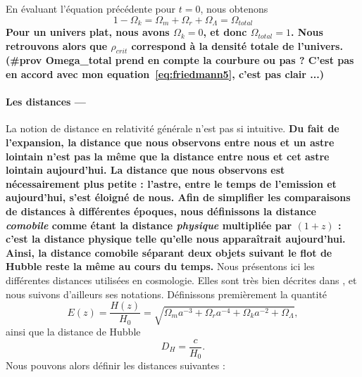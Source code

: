 \documentclass[11pt, twoside, a4paper, openright]{report}
\begin{document}
En évaluant l'équation précédente pour $t=0$, nous obtenons
\begin{equation}
  \label{eq:sum_omega}
 1 - \Omega_k  =  \Omega_m + \Omega_r + \Omega_{\Lambda} = \Omega_{total}
\end{equation}
\textbf{Pour un univers plat, nous avons $\Omega_k = 0$, et donc $\Omega_{total} = 1$. Nous retrouvons alors que $\rho_{crit}$ correspond à la densité totale de l'univers. (\#prov Omega\_total prend en compte la courbure ou pas ? C'est pas en accord avec mon equation~\ref{eq:friedmann5}, c'est pas clair ...)}


\paragraph{Les distances —}
La notion de distance en relativité générale n'est pas si intuitive.
\textbf{Du fait de l'expansion, la distance que nous observons entre nous et un astre lointain n'est pas la même que la distance entre nous et cet astre lointain aujourd'hui. La distance que nous observons est nécessairement plus petite : l'astre, entre le temps de l'emission et aujourd'hui, s'est éloigné de nous. Afin de simplifier les comparaisons de distances à différentes époques, nous définissons la distance \emph{comobile} comme étant la distance \emph{physique} multipliée par $(1+z)$ : c'est la distance physique telle qu'elle nous apparaîtrait aujourd'hui. Ainsi, la distance comobile séparant deux objets suivant le flot de Hubble reste la même au cours du temps.}
Nous présentons ici les différentes distances utilisées en cosmologie. Elles sont très bien décrites dans \cite{CITE: Hogg 1999}, et nous suivons d'ailleurs ses notations. Définissons premièrement la quantité
\begin{equation}
  \label{eq:dist_ez}
  E(z) = \frac{H(z)}{H_0} 
  = \sqrt{\Omega_m a^{-3} + \Omega_r a^{-4} + \Omega_k a^{-2} + \Omega_{\Lambda}} ,
\end{equation}
ainsi que la distance de Hubble
\begin{equation}
  \label{eq:dist_hubble}
  D_H = \frac{c}{H_0} .
\end{equation}
Nous pouvons alors définir les distances suivantes :
\end{document}
